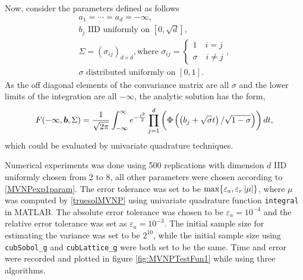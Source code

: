 \documentclass{iitthesis}
\begin{document}
Now, consider the parameters defined as follows 
\begin{subequations} \label{MVNPexp1param}
\begin{gather}
a_1=\cdots=a_d =-\infty,\\
b_j \text{ IID uniformly on } [0,\sqrt{d}],\\
\Sigma = (\sigma_{ij})_{d\times d}, \text{where } \sigma_{ij} =  
  \begin{cases}1 \quad i=j \\
   \sigma \quad i \neq j 
  \end{cases},\\
\sigma \text{ distributed uniformly on } [0,1].
\end{gather}
\end{subequations}
As the off diagonal elements of the convariance matrix are all $\sigma$ and the lower limits of the integration are all $-\infty$, the analytic solution has the form,
\begin{align}\label{truesolMVNP}
F(-\infty, \boldsymbol{b},\Sigma) = \frac{1}{\sqrt{2\pi}}\int_{-\infty}^{\infty} e^{-\frac{t^2}{2}} \prod_{j=1}^d \left(\Phi\left(\left(b_j+\sqrt{\sigma}t\right)/\sqrt{1-\sigma}\right)\right)dt,
\end{align}
which could be evaluated by univariate quadrature techniques.

Numerical experiments was done using 500 replications with dimension $d$ IID uniformly chosen from 2 to 8, all other parameters were chosen according to \eqref{MVNPexp1param}. The error tolerance was set to be $\max\{\varepsilon_a,\varepsilon_r \left \lvert \mu \right \rvert\}$, where $\mu$ was computed by \eqref{truesolMVNP} using univariate quadrature function {\tt integral} in MATLAB. The absolute error tolerance was chosen to be $\varepsilon_a = 10^{-4}$ and the relative error tolerance was set as $\varepsilon_a = 10^{-3}$. The initial sample size for estimating the variance was set to be $2^10$, while the initial sample size using {\tt cubSobol\_g} and {\tt cubLattice\_g} were both set to be the same. Time and error were recorded and plotted in figure \ref{fig:MVNPTestFun1} while using three algorithms.
\end{document}
